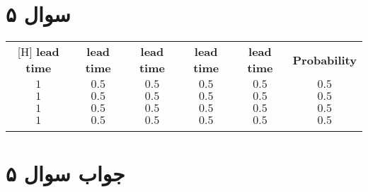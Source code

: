 \section*{سوال ۵}

\begin{table}
	\centering
	\begin{tabular}{|c|c|c|c|c|c|}[H]
		\arrayrulecolor{red}\hline
		\textbf{lead time} & \textbf{lead time} & \textbf{lead time} & \textbf{lead time} & \textbf{lead time} & \textbf{Probability} \\
		\arrayrulecolor{red}\hline
		$1$ & $0.5$ & $0.5$ & $0.5$ & $0.5$ & $0.5$ \\
		\hline
		$1$ & $0.5$ & $0.5$ & $0.5$ & $0.5$ & $0.5$ \\
		\hline
		$1$ & $0.5$ & $0.5$ & $0.5$ & $0.5$ & $0.5$ \\
		\hline
		$1$ & $0.5$ & $0.5$ & $0.5$ & $0.5$ & $0.5$ \\
		\arrayrulecolor{red}\hline
	\end{tabular}
\end{table}

\section*{جواب سوال ۵}
